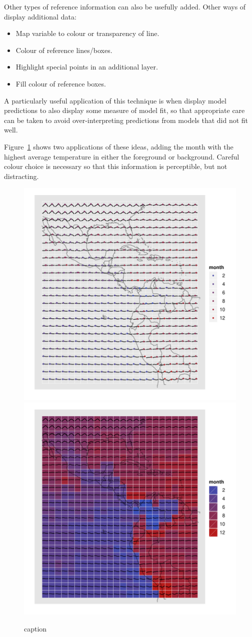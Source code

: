\documentclass[oneside]{article}
\begin{document}
Other types of reference information can also be usefully added. 
Other ways of display additional data:

\begin{itemize}

  \item Map variable to colour or transparency of line. 
  
  \item Colour of reference lines/boxes.
  
  \item Highlight special points in an additional layer.

  \item Fill colour of reference boxes. 
  
\end{itemize}

A particularly useful application of this technique is when display model predictions to also display some measure of model fit, so that appropriate care can be taken to avoid over-interpreting predictions from models that did not fit well.

Figure~\ref{fig:ref-adv} shows two applications of these ideas, adding the month with the highest average temperature in either the foreground or background. Careful colour choice is necessary so that this information is perceptible, but not distracting.

\begin{figure}[htbp]
  \centering
    \includegraphics[width=0.5\linewidth]{ref-max-1}%
    \includegraphics[width=0.5\linewidth]{ref-max-2}
  \caption{caption}
  \label{fig:ref-adv}
\end{figure}
\end{document}
